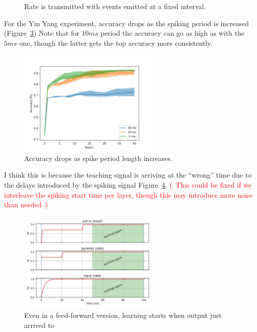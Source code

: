 \documentclass{article}
\newcommand\note[1]{\textcolor{red}{(~#1~)}}
\begin{document}
\begin{figure}[h!bt]
\begin{subfigure}[b]{0.35\textwidth}
        \vspace*{0.75cm}
        \caption{}
        \label{fig:fixed-period-signal-difference}
    \end{subfigure}
    \caption{Rate is transmitted with events emitted at a fixed interval.}
    \label{fig:fixed-period-rate-example}
\end{figure}

For the Yin Yang experiment, accuracy drops as the spiking period is increased (Figure~\ref{fig:accuracy-fixed-period})
Note that for $10 ms$ period the accuracy can go as high as with the $5 ms$ one, though the latter gets the top accuracy more consistently.


\begin{figure}[h!bt]
    \centering
    \includegraphics[width=0.6\textwidth]{accuracies_per_period_length.png}
    \caption{Accuracy drops as spike period length increases.}
    \label{fig:accuracy-fixed-period}
\end{figure}

I think this is because the teaching signal is arriving at the ``wrong'' time due to the delays introduced by the spiking signal Figure~\ref{fig:output-lag-vs-learning}.
\note{This could be fixed if we interleave the spiking start time per layer, though this may introduce more noise than needed}
\begin{figure}[h!bt]
    \centering
    \includegraphics[width=0.6\textwidth]{rate_player_plus_pyramid_plus_inter_behaviour.png}
    \caption{Even in a feed-forward version, learning starts when output just arrived to }
    \label{fig:output-lag-vs-learning}
\end{figure}
\end{document}
